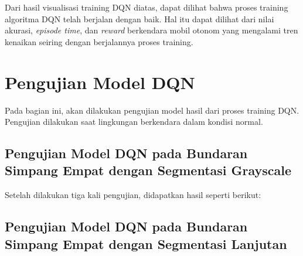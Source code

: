 Dari hasil visualisasi training DQN diatas, dapat dilihat bahwa proses training algoritma DQN telah berjalan dengan baik. Hal itu dapat dilihat dari nilai akurasi, \textit{episode time}, dan \textit{reward} berkendara mobil otonom yang mengalami tren kenaikan seiring dengan berjalannya proses training.

\fi

\section{Pengujian Model DQN}
\label{sec:pengujian_model_dqn}

Pada bagian ini, akan dilakukan pengujian model hasil dari proses training DQN. Pengujian dilakukan saat lingkungan berkendara dalam kondisi normal.

\subsection{Pengujian Model DQN pada Bundaran Simpang Empat dengan Segmentasi Grayscale}
\label{sec:pengujian_dqn_bundaran_simpangempat_segmentasi_grayscale}

Setelah dilakukan tiga kali pengujian, didapatkan hasil seperti berikut:

\begin{table}[H]
	\caption{Hasil pengujian.}
	\label{tb:hasilpengujian}
\end{table}


\subsection{Pengujian Model DQN pada Bundaran Simpang Empat dengan Segmentasi Lanjutan}
\label{sec:pengujian_dqn_bundaran_simpangempat_segmentasi_hitam_putih}

